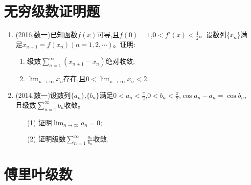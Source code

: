 \documentclass[12pt, a4paper, oneside, UTF8]{ctexbook}
\begin{document}
\section{无穷级数证明题}

\begin{enumerate}[label=\arabic*.,start=13]
    \item (2016,数一)已知函数$f(x)$可导,且$f(0)=1$,$0<f'(x)<\frac{1}{2}$。设数列$\{x_n\}$满足$x_{n+1}=f(x_n)(n=1,2,\cdots)$。证明:
    \begin{enumerate}[label=(\roman*)]
        \item 级数$\displaystyle\sum_{n=1}^{\infty}(x_{n+1}-x_n)$绝对收敛;
        \item $\displaystyle\lim_{n\rightarrow\infty} x_n$存在,且$\displaystyle 0<\lim_{n\rightarrow\infty} x_n<2$.
    \end{enumerate}
    
    \begin{solution}
    \newpage
    \end{solution}
    
    \item (2014,数一)设数列$\{a_n\}$,$\{b_n\}$满足$0<a_n<\frac{\pi}{2}$,$0<b_n<\frac{\pi}{2}$,$\cos a_n-a_n=\cos b_n$,且级数$\sum_{n=1}^{\infty} b_n$收敛。
    \begin{enumerate}[label=(\roman*)]
        \item[(1)] 证明$\displaystyle\lim_{n\rightarrow\infty} a_n=0$;
        \item[(2)] 证明级数$\displaystyle\sum_{n=1}^{\infty}\frac{a_n}{b_n}$收敛.
    \end{enumerate}
    
    \begin{solution}
    \newpage
    \end{solution}
\end{enumerate}

\section{傅里叶级数}
\end{document}

